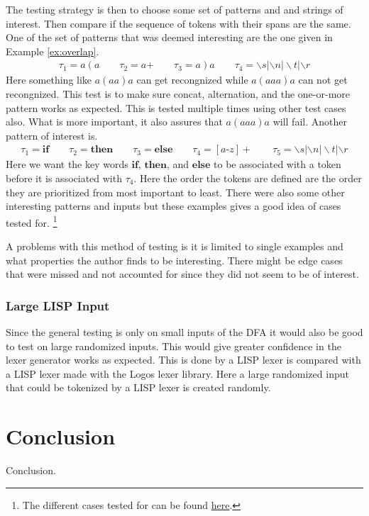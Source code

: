 \documentclass[a4paper,12pt]{article}
\theoremstyle{definition}
\begin{document}
The testing strategy is then to choose some set of patterns and and strings of interest. Then compare if the sequence of tokens with their spans are the same. One of the set of patterns that was deemed interesting are the one given in Example \ref{ex:overlap}.
\begin{align*}
  \tau_1 = a(a \qquad \tau_2 = a\text{+} \qquad \tau_3 = a)a \qquad \tau_4 = \backslash s|\backslash n |\backslash t | \backslash r
\end{align*}
Here something like $a(aa)a$ can get recongnized while $a(aaa)a$ can not get recongnized. This test is to make sure concat, alternation, and the one-or-more pattern works as expected. This is tested multiple times using other test cases also. What is more important, it also assures that $a(aaa)a$ will fail. Another pattern of interest is.
\begin{align*}
  \tau_1 = \mathbf{if} \qquad \tau_2 = \mathbf{then} \qquad \tau_3 = \mathbf{else} \qquad \tau_4 = [a\text{-}z]+ \qquad \tau_5 = \backslash s|\backslash n |\backslash t | \backslash r
\end{align*}
Here we want the key words $\mathbf{if}$, $\mathbf{then}$, and $\mathbf{else}$ to be associated with a token before it is associated with $\tau_4$. Here the order the tokens are defined are the order they are prioritized from most important to least. There were also some other interesting patterns and inputs but these examples gives a good idea of cases tested for. \footnote{The different cases tested for can be found \href{https://github.com/diku-dk/alpacc/tree/20b98004bb18bfd7d8031ffaf053f382f821889a/futhark-tests/lexer-tests}{here}.}

A problems with this method of testing is it is limited to single examples and what properties the author finds to be interesting. There might be edge cases that were missed and not accounted for since they did not seem to be of interest.
\subsubsection{Large LISP Input}
Since the general testing is only on small inputs of the DFA it would also be good to test on large randomized inputs. This would give greater confidence in the lexer generator works as expected. This is done by a LISP lexer is compared with a LISP lexer made with the Logos lexer library. Here a large randomized input that could be tokenized by a LISP lexer is created randomly.

\section{Conclusion}
Conclusion.
\printbibliography
\end{document}
